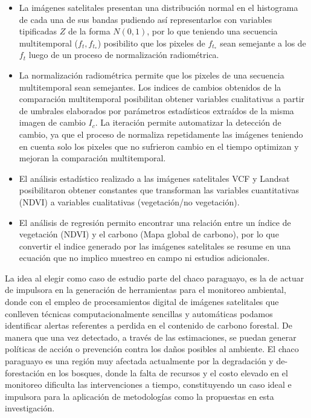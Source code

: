 \begin{itemize}
\item La im\'agenes	satelitales presentan una distribuci\'on normal en el histograma de cada una de sus bandas pudiendo as\'i representarlos con variables tipificadas $ Z $ de la forma $ N(0,1) $, por lo que teniendo una secuencia multitemporal ($ f_{t},f_{t_{*}} $) posibilito que los pixeles de $ f_{t_{*}} $ sean semejante a los de $ f_{t} $ luego de un proceso de normalizaci\'on radiom\'etrica. 
\item La normalizaci\'on radiom\'etrica permite que los pixeles de una secuencia multitemporal sean semejantes. Los indices de cambios obtenidos de la comparaci\'on multitemporal posibilitan obtener variables cualitativas a partir de umbrales elaborados por par\'ametros estad\'isticos extra\'idos de la misma imagen de cambio $ I_{c} $. La iteraci\'on permite automatizar la detecci\'on de cambio, ya que el proceso de normaliza repetidamente las im\'agenes teniendo en cuenta solo los pixeles que no sufrieron cambio en el tiempo optimizan y mejoran la comparaci\'on multitemporal.
\item El an\'alisis estad\'istico realizado a las im\'agenes satelitales VCF y Landsat posibilitaron obtener constantes que transforman las variables cuantitativas (NDVI) a variables cualitativas (vegetaci\'on/no vegetaci\'on).
\item El an\'alisis de regresi\'on permito encontrar una relaci\'on entre un \'indice de vegetaci\'on (NDVI) y el carbono (Mapa global de carbono), por lo que convertir el indice generado por las im\'agenes satelitales se resume en una ecuaci\'on que no implico muestreo en campo ni estudios adicionales.
\end{itemize}
La idea al elegir como caso de estudio parte del chaco paraguayo, es la de actuar de impulsora en la generaci\'on de herramientas para el monitoreo ambiental, donde con el empleo de procesamientos digital de im\'agenes satelitales que conlleven t\'ecnicas computacionalmente sencillas y autom\'aticas podamos identificar alertas referentes a perdida en el contenido de carbono forestal. De manera que una vez detectado, a trav\'es de las estimaciones, se puedan generar pol\'iticas de acci\'on o prevenci\'on contra los da\~{n}os posibles al ambiente. El chaco paraguayo es una regi\'on muy afectada actualmente por la degradaci\'on y de-forestaci\'on en los bosques, donde la falta de recursos y el costo  elevado en el monitoreo dificulta las intervenciones a tiempo, constituyendo un caso ideal e impulsora para la aplicaci\'on de metodolog\'ias como la propuestas en esta investigaci\'on.


